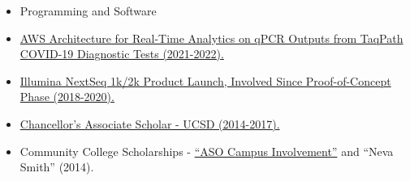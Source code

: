 \begin{itemize}
\item \textcolor{emphasis}{Programming and Software} 
\end{itemize}








\begin{itemize}
\item \href{https://www.thermofisher.com/mx/es/home/clinical/clinical-genomics/pathogen-detection-solutions/covid-19-sars-cov-2/multiplex.html}{AWS Architecture for Real-Time Analytics on qPCR Outputs from TaqPath COVID-19 Diagnostic Tests (2021-2022).} 
\item \href{https://www.illumina.com/systems/sequencing-platforms/nextseq-1000-2000.html}{Illumina NextSeq 1k/2k Product Launch, Involved Since Proof-of-Concept Phase (2018-2020).} 
\item \href{https://casp.ucsd.edu/}{Chancellor's Associate Scholar - UCSD (2014-2017).} 
\item Community College Scholarships - \href{https://swccd.academicworks.com/opportunities/5821}{“ASO Campus Involvement”} and “Neva Smith” (2014).
\end{itemize}